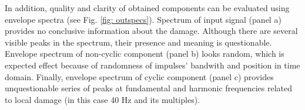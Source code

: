 \documentclass[conference]{IEEEtran}
\begin{document}
In addition, quality and clarity of obtained components can be evaluated using envelope spectra (see Fig. \ref{fig: outspecs}). Spectrum of input signal (panel a) provides no conclusive information about the damage. Although there are several visible peaks in the spectrum, their presence and meaning is questionable. Envelope spectrum of non-cyclic component (panel b) looks random, which is expected effect because of randomness of impulses' bandwith and position in time domain. Finally, envelope spectrum of cyclic component (panel c) provides unquestionable series of peaks at fundamental and harmonic frequencies related to local damage (in this case 40 Hz and its multiples). 
%
%



%
%
\end{document}
